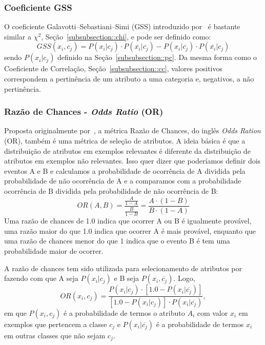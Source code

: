 \subsubsection{Coeficiente GSS}
\label{subsubsection::gss}
O coeficiente Galavotti–Sebastiani–Simi (GSS) introduzido por~\cite{Galavotti00} é bastante similar a $\chi^2$, Seção~\ref{subsubsection::chi}, e pode ser definido como:
\begin{equation}\label{eqn::gss}
   GSS(x_i, c_j) = P(x_i|c_j) \cdot P(\overline{x_i}|\overline{c_j}) - P(x_i|\overline{c_j}) \cdot P(\overline{x_i}|c_j) 
\end{equation}
sendo $P(x_i|c_j)$ definido na Seção~\ref{subsubsection::pc}. Da mesma forma como o Coeficiente de Correlação, Seção~\ref{subsubsection::cc}, valores positivos correspondem a pertinência de um atributo a uma categoria e, negativos, a não pertinência. 


\subsubsection{Razão de Chances - \textit{Odds Ratio} (OR)}
\label{subsubsection::or}

Proposta originalmente por~\cite{Rijsbergen79}, a métrica Razão de Chances, do inglês \textit{Odds Ration} (OR), também é uma métrica de seleção de atributos. A ideia básica é que a distribuição de atributos em exemplos relevantes é diferente da distribuição de atributos em exemplos não relevantes. Isso quer dizer que poderíamos definir dois eventos A e B e calculamos a probabilidade de ocorrência de A dividida pela probabilidade de não ocorrência de A e a comparamos com a probabilidade ocorrência de B dividida pela probabilidade de não ocorrência de B:
\begin{equation}\label{eqn::or}
   OR(A, B) = \frac{\frac{A}{1-A}} {\frac{B}{1-B}} = \frac{ A \cdot ( 1 - B )} { B \cdot ( 1 - A ) } 
\end{equation}
Uma razão de chances de 1.0 indica que ocorrer A ou B é igualmente provável, uma razão maior do que 1.0 indica que ocorrer A é mais provável, enquanto que uma razão de chances menor do que 1 indica que o evento B é tem uma probabilidade maior de ocorrer.

A razão de chances tem sido utilizada para selecionamento de atributos por \cite{Mladenic98} fazendo com que A seja $P(x_i|c_j)$ e B seja $P(x_i,\overline{c_j})$. Logo,
\begin{equation}\label{eqn::or}
   OR(x_i, c_j) = \frac{ P(x_i|c_j) \cdot [ 1.0 - P(x_i|\overline{c_j}) ] }{ [ 1.0 - P(x_i|c_j) ] \cdot P(x_i|\overline{c_j})},
\end{equation}
em que $P(x_i, c_j)$ é a probabilidade de termos o atributo $A_i$ com valor $x_i$ em exemplos que pertencem a classe $c_j$ e $P(x_i|\overline{c_j})$ é a probabilidade de termos $x_i$ em outras classes que não sejam $c_j$.

